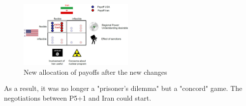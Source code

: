 \begin{figure}[h]
    \centering
    \includegraphics[width=0.5\textwidth]{Pictures/iran_us_new_game_theory.png}
    \caption{New allocation of payoffs after the new changes}
\end{figure}

As a result, it was no longer a "prisoner's dilemma" but a "concord" game.
The negotiations between P5+1 and Iran could start.

